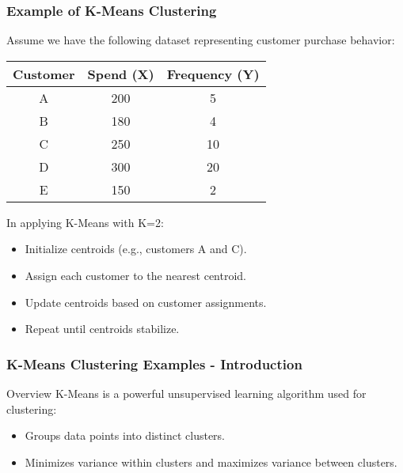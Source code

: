 \documentclass[aspectratio=169]{beamer}
\begin{document}
\begin{frame}[fragile]
    \frametitle{Example of K-Means Clustering}
    Assume we have the following dataset representing customer purchase behavior:

    \begin{table}[ht]
        \centering
        \begin{tabular}{|c|c|c|}
            \hline
            Customer & Spend (X) & Frequency (Y) \\
            \hline
            A & 200 & 5 \\
            B & 180 & 4 \\
            C & 250 & 10 \\
            D & 300 & 20 \\
            E & 150 & 2 \\
            \hline
        \end{tabular}
    \end{table}

    In applying K-Means with K=2:
    \begin{itemize}
        \item Initialize centroids (e.g., customers A and C).
        \item Assign each customer to the nearest centroid.
        \item Update centroids based on customer assignments.
        \item Repeat until centroids stabilize.
    \end{itemize}
\end{frame}

\begin{frame}[fragile]
    \frametitle{K-Means Clustering Examples - Introduction}
    \begin{block}{Overview}
        K-Means is a powerful unsupervised learning algorithm used for clustering:
        \begin{itemize}
            \item Groups data points into distinct clusters.
            \item Minimizes variance within clusters and maximizes variance between clusters.
        \end{itemize}
    \end{block}
\end{frame}
\end{document}
